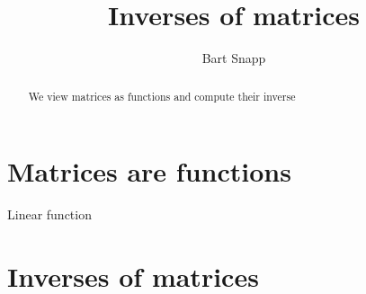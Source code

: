 \documentclass{ximera}
\author{Bart Snapp}
\title{Inverses of matrices}
\begin{document}
\begin{abstract}
  We view matrices as functions and compute their inverse
\end{abstract}
\maketitle

\section{Matrices are functions}

\begin{definition}
  Linear function
\end{definition}



\section{Inverses of matrices}
\end{document}

